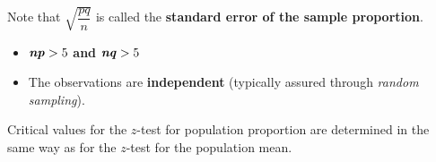 \documentclass[
  11pt,
]{book}
\begin{document}
Note that \(\sqrt{\dfrac{pq}{n}}\) is called the \textbf{standard error of the sample proportion}.

\begin{centering}
\begin{tcolorbox}[adjusted title=Conditions for the one-sample z-test for the population proportion:, halign title = center,colback=red!5,colframe=red!70!black, halign = center]
\begin{itemize}
    \item $\mathbf{\textbf{\emph{np}}>\text{5}}$ \textbf{ and } $\mathbf{\textbf{\emph{nq}}>\text{5}}$
    \item The observations are \textbf{independent} (typically assured through \textit{random sampling}).
\end{itemize}
\end{tcolorbox}
\end{centering}

\pagebreak

Critical values for the \(z\)-test for population proportion are determined in the same way as for the \(z\)-test for the population mean.
\end{document}
